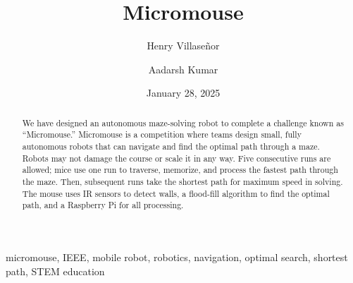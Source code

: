﻿\documentclass[12pt,conference,onecolumn]{IEEEtran}
\title{Micromouse}
\author{Henry Villase\~{n}or \and Aadarsh Kumar}
\date{January 28, 2025}
\begin{document}
\maketitle 

\begin{abstract}
We have designed an autonomous maze-solving robot to complete a challenge known as ``Micromouse.'' Micromouse is a competition where teams design small, fully autonomous robots that can navigate and find the optimal path through a maze. Robots may not damage the course or scale it in any way. Five consecutive runs are allowed; mice use one run to traverse, memorize, and process the fastest path through the maze. Then, subsequent runs take the shortest path for maximum speed in solving. The mouse uses IR sensors to detect walls, a flood-fill algorithm to find the optimal path, and a Raspberry Pi for all processing.
\end{abstract}

\begin{IEEEkeywords}
micromouse, IEEE, mobile robot, robotics, navigation, optimal search, shortest path, STEM education
\end{IEEEkeywords}
\end{document}

